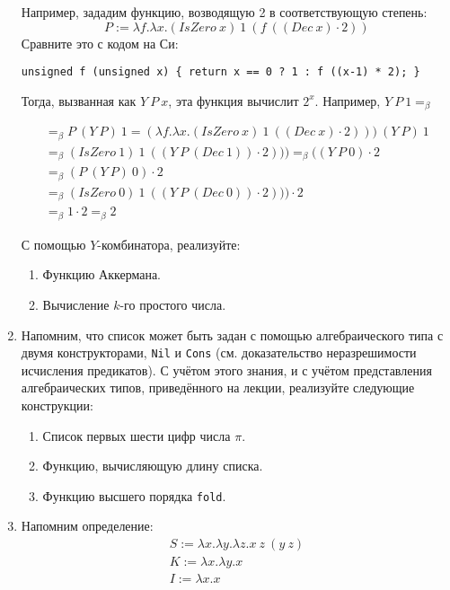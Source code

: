 \documentclass[10pt,a4paper,oneside]{article}
\begin{document}
\begin{enumerate}
Например, зададим функцию, возводящую 2 в соответствующую степень: $$P := \lambda f.\lambda x.(IsZero\ x)\ 1\ (f\ ((Dec\ x) \cdot 2))$$
Сравните это с кодом на Си: 
\begin{center}\verb!unsigned f (unsigned x) { return x == 0 ? 1 : f ((x-1) * 2); }!\end{center}
Тогда, вызванная как $Y\ P\ x$, эта функция вычислит $2^x$. Например, $Y\ P\ 1 =_\beta$

\vspace{-0.3cm}
$$\begin{array}{l}=_\beta P\ (Y\ P)\ 1 = (\lambda f.\lambda x.(IsZero\ x)\ 1\ ((Dec\ x)\cdot 2)))\ (Y\ P)\ 1 \\
  =_\beta (IsZero\ 1)\ 1\ ((Y\ P\ (Dec\ 1)) \cdot 2))) =_\beta ((Y\ P\ 0) \cdot 2 \\
  =_\beta (P\ (Y\ P)\ 0) \cdot 2 \\
  =_\beta (IsZero\ 0)\ 1\ ((Y\ P\ (Dec\ 0)) \cdot 2))) \cdot 2\\
  =_\beta 1 \cdot 2 =_\beta 2\end{array}$$

С помощью $Y$-комбинатора, реализуйте:
\begin{enumerate}
\item Функцию Аккермана.
\item Вычисление $k$-го простого числа.
\end{enumerate}

\item Напомним, что список может быть задан с помощью алгебраического типа с двумя конструкторами, \verb!Nil! и \verb!Cons!
(см. доказательство неразрешимости исчисления предикатов). С учётом этого знания, и с учётом представления 
алгебраических типов, приведённого на лекции, реализуйте следующие конструкции:
\begin{enumerate}
\item Список первых шести цифр числа $\pi$.
\item Функцию, вычисляющую длину списка.
\item Функцию высшего порядка \verb!fold!.
\end{enumerate}

\item Напомним определение:
$$\begin{array}{l}
S := \lambda x.\lambda y.\lambda z.x\ z\ (y\ z)\\
K := \lambda x.\lambda y.x\\
I := \lambda x.x
\end{array}$$


\end{enumerate}
\end{document}

